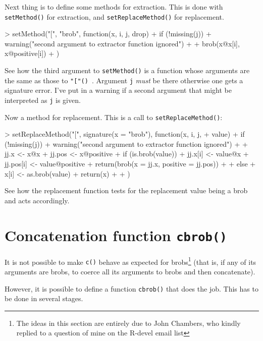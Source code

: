 \documentclass[a4paper]{article}
\begin{document}
Next thing is to define some methods for extraction.  This is done
with {\tt setMethod()} for extraction, and {\tt setReplaceMethod()}
for replacement.

\begin{Schunk}
\begin{Sinput}
> setMethod("[", "brob", function(x, i, j, drop) {
+     if (!missing(j)) {
+         warning("second argument to extractor function ignored")
+     }
+     brob(x@x[i], x@positive[i])
+ })
\end{Sinput}
\end{Schunk}

See how the third argument to {\tt setMethod()} is a function whose
arguments are the same as those to {\tt  "["() %
}.  Argument {\tt j} {\em must} be there otherwise one gets a
  signature error.  I've put in a warning if a second argument that
  might be interpreted as {\tt j} is given.

Now a method for replacement.  This is a call to {\tt setReplaceMethod()}:


\begin{Schunk}
\begin{Sinput}
> setReplaceMethod("[", signature(x = "brob"), function(x, i, j, 
+     value) {
+     if (!missing(j)) {
+         warning("second argument to extractor function ignored")
+     }
+     jj.x <- x@x
+     jj.pos <- x@positive
+     if (is.brob(value)) {
+         jj.x[i] <- value@x
+         jj.pos[i] <- value@positive
+         return(brob(x = jj.x, positive = jj.pos))
+     }
+     else {
+         x[i] <- as.brob(value)
+         return(x)
+     }
+ })
\end{Sinput}
\end{Schunk}


See how the replacement function tests for the replacement value being
a brob and acts accordingly.

\section{Concatenation function {\tt cbrob()}}
\label{cbrob}

It is not possible to make {\tt c()} behave as expected for
brobs\footnote{The ideas in this section are entirely due to John
Chambers, who kindly replied to a question of mine on the R-devel
email list} (that is, if any of its arguments are brobs, to coerce all
its arguments to brobs and then concatenate).

However, it is possible to define a function {\tt cbrob()} that does
the job.  This has to be done in several stages.
\end{document}

